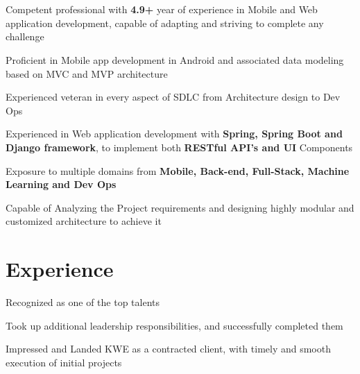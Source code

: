 \documentclass[]{deedy-resume-openfont}
\begin{document}
    
%
%
%
%
\section{}
\raggedright

\begin{tightemize}
	\item Competent professional with \textbf{4.9+} year of experience in Mobile and Web application development, capable of adapting and striving to complete any challenge
	\item Proficient in Mobile app development in Android and associated data modeling based on MVC and MVP architecture
	\item Experienced veteran in every aspect of SDLC from Architecture design to Dev Ops
	\item Experienced in Web application development with \textbf{Spring, Spring Boot and Django framework}, to implement both \textbf{RESTful API's and UI} Components
	\item Exposure to multiple domains from \textbf{Mobile, Back-end, Full-Stack, Machine Learning and Dev Ops}
	\item Capable of Analyzing the Project requirements and designing highly modular and customized architecture to achieve it
\end{tightemize}
\sectionsep
%
%
\section{Experience}
\hfill {}
\begin{tightemize}
	\item Recognized as one of the top talents
	\item Took up additional leadership responsibilities, and successfully completed them
	\item Impressed and Landed KWE as a contracted client, with timely and smooth execution of initial projects
\end{tightemize}
\sectionsep
%
%
\end{document}
